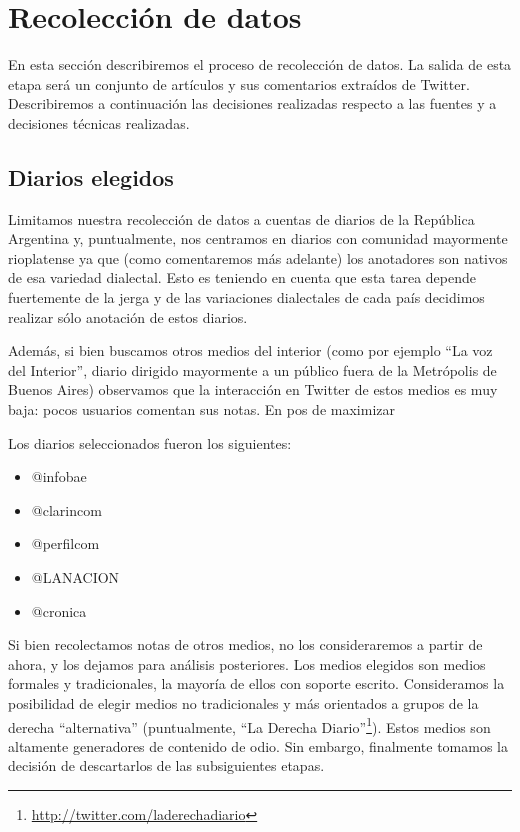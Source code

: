 

\section{Recolección de datos}

En esta sección describiremos el proceso de recolección de datos. La salida de esta etapa será un conjunto de artículos y sus comentarios extraídos de Twitter. Describiremos a continuación las decisiones realizadas respecto a las fuentes y a decisiones técnicas realizadas.

\subsection{Diarios elegidos}

Limitamos nuestra recolección de datos a cuentas de diarios de la República Argentina y, puntualmente, nos centramos en diarios con comunidad mayormente rioplatense ya que (como comentaremos más adelante) los anotadores son nativos de esa variedad dialectal. Esto es teniendo en cuenta que esta tarea depende fuertemente de la jerga y de las variaciones dialectales de cada país decidimos realizar sólo anotación de estos diarios.

Además, si bien buscamos otros medios del interior (como por ejemplo ``La voz del Interior'', diario dirigido mayormente a un público fuera de la Metrópolis de Buenos Aires) observamos que la interacción en Twitter de estos medios es muy baja: pocos usuarios comentan sus notas. En pos de maximizar

Los diarios seleccionados fueron los siguientes:

\begin{itemize}
    \item @infobae
    \item @clarincom
    \item @perfilcom
    \item @LANACION
    \item @cronica
\end{itemize}


Si bien recolectamos notas de otros medios, no los consideraremos a partir de ahora, y los dejamos para análisis posteriores. Los medios elegidos son medios formales y tradicionales, la mayoría de ellos con soporte escrito. Consideramos la posibilidad de elegir medios no tradicionales y más orientados a grupos de la derecha ``alternativa'' (puntualmente, ``La Derecha Diario''\footnote{\url{http://twitter.com/laderechadiario}}). Estos medios son altamente generadores de contenido de odio. Sin embargo, finalmente tomamos la decisión de descartarlos de las subsiguientes etapas.


